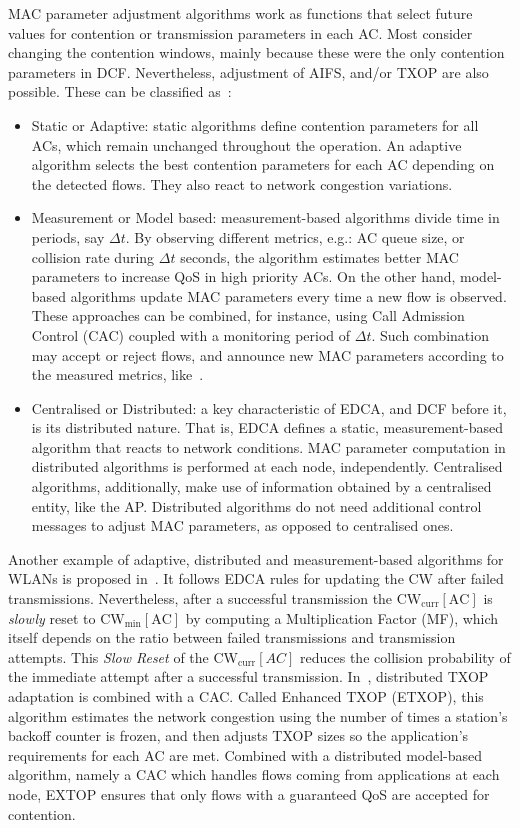 \documentclass[a4paper]{article}
\begin{document}
MAC parameter adjustment algorithms work as functions that select future values for contention or transmission parameters in each AC. Most consider changing the contention windows, mainly because these were the only contention parameters in DCF. Nevertheless, adjustment of AIFS, and/or TXOP are also possible. These can be classified as~\cite{cano2010tuning}:
	\begin{itemize}
		\item Static or Adaptive: static algorithms define contention parameters for all ACs, which remain unchanged throughout the operation. An adaptive algorithm selects the best contention parameters for each AC depending on the detected flows. They also react to network congestion variations.
		\item Measurement or Model based: measurement-based algorithms divide time in periods, say $\Delta t$. By observing different metrics, e.g.: AC queue size, or collision rate during $\Delta t$ seconds, the algorithm estimates better MAC parameters to increase QoS in high priority ACs. On the other hand, model-based algorithms update MAC parameters every time a new flow is observed. These approaches can be combined, for instance, using Call Admission Control (CAC) coupled with a monitoring period of $\Delta t$. Such combination may accept or reject flows, and announce new MAC parameters according to the measured metrics, like~\cite{bellalta290call}.
		\item Centralised or Distributed: a key characteristic of EDCA, and DCF before it, is its distributed nature. That is, EDCA defines a static, measurement-based algorithm that reacts to network conditions. MAC parameter computation in distributed algorithms is performed at each node, independently. Centralised algorithms, additionally, make use of information obtained by a centralised entity, like the AP. Distributed algorithms do not need additional control messages to adjust MAC parameters, as opposed to centralised ones.
	\end{itemize} 

Another example of adaptive, distributed and measurement-based algorithms for WLANs is proposed in~\cite{1200574}. It follows EDCA rules for updating the CW after failed transmissions. Nevertheless, after a successful transmission the CW$_{\text{curr}}[\text{AC}]$ is \emph{slowly} reset to CW$_{\min}[\text{AC}]$ by computing a Multiplication Factor (MF), which itself depends on the ratio between failed transmissions and transmission attempts. This \emph{Slow Reset} of the CW$_{\text{curr}}[AC]$ reduces the collision probability of the immediate attempt after a successful transmission. In~\cite{Ksentini}, distributed TXOP adaptation is combined with a CAC. Called Enhanced TXOP (ETXOP), this algorithm estimates the network congestion using the number of times a station's backoff counter is frozen, and then adjusts TXOP sizes so the application's requirements for each AC are met. Combined with a distributed model-based algorithm, namely a CAC which handles flows coming from applications at each node, EXTOP ensures that only flows with a guaranteed QoS are accepted for contention.
\end{document}
